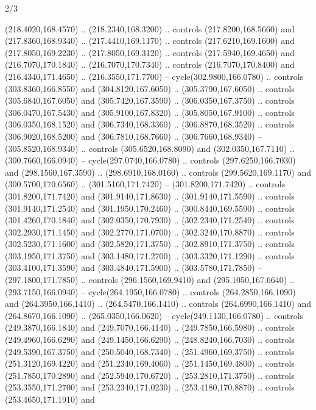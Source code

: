 \begin{flagdescription}{2/3}
\begin{scope}[xshift=0.5\flaglength,yshift=0.5\flagwidth,scale=\flagwidth/259.2]
\begin{scope}[y=0.8pt, x=0.8pt, yscale=-1,shift={(-243,-162)}]
      (218.4020,168.4570) .. (218.2340,168.3200) .. controls (217.8200,168.5660) and
      (217.8360,168.9340) .. (217.4410,169.1170) .. controls (217.6210,169.1600) and
      (217.8050,169.2230) .. (217.8050,169.3120) .. controls (217.5940,169.4650) and
      (216.7070,170.1840) .. (216.7070,170.7340) .. controls (216.7070,170.8400) and
      (216.4340,171.4650) .. (216.3550,171.7700) -- cycle(302.9800,166.0780) ..
      controls (303.8360,166.8550) and (304.8120,167.6050) .. (305.3790,167.6050) ..
      controls (305.6840,167.6050) and (305.7420,167.3590) .. (306.0350,167.3750) ..
      controls (306.0470,167.5430) and (305.9100,167.8320) .. (305.8050,167.9100) ..
      controls (306.0350,168.1520) and (306.7340,168.3360) .. (306.8870,168.3520) ..
      controls (306.9020,168.5200) and (306.7810,168.7660) .. (306.7660,168.9340) --
      (305.8520,168.9340) .. controls (305.6520,168.8090) and (302.0350,167.7110) ..
      (300.7660,166.0940) -- cycle(297.0740,166.0780) .. controls
      (297.6250,166.7030) and (298.1560,167.3590) .. (298.6910,168.0160) .. controls
      (299.5620,169.1170) and (300.5700,170.6560) .. (301.5160,171.7420) --
      (301.8200,171.7420) .. controls (301.8200,171.7420) and (301.9140,171.8630) ..
      (301.9140,171.5590) .. controls (301.9140,171.2540) and (301.1950,170.2460) ..
      (300.8440,169.5590) .. controls (301.4260,170.1840) and (302.0350,170.7930) ..
      (302.2340,171.2540) .. controls (302.2930,171.1450) and (302.2770,171.0700) ..
      (302.3240,170.8870) .. controls (302.5230,171.1600) and (302.5820,171.3750) ..
      (302.8910,171.3750) .. controls (303.1950,171.3750) and (303.1480,171.2700) ..
      (303.3320,171.1290) .. controls (303.4100,171.3590) and (303.4840,171.5900) ..
      (303.5780,171.7850) -- (297.1800,171.7850) .. controls (296.1560,169.9410) and
      (295.1050,167.6640) .. (293.7150,166.0940) -- cycle(264.1950,166.0780) ..
      controls (264.2850,166.1090) and (264.3950,166.1410) .. (264.5470,166.1410) ..
      controls (264.6990,166.1410) and (264.8670,166.1090) .. (265.0350,166.0620) --
      cycle(249.1130,166.0780) .. controls (249.3870,166.1840) and
      (249.7070,166.4140) .. (249.7850,166.5980) .. controls (249.4960,166.6290) and
      (249.1450,166.6290) .. (248.8240,166.7030) .. controls (249.5390,167.3750) and
      (250.5040,168.7340) .. (251.4960,169.3750) .. controls (251.3120,169.4220) and
      (251.2340,169.4060) .. (251.1450,169.4800) .. controls (251.7850,170.2890) and
      (252.5940,170.6720) .. (253.2810,171.3750) .. controls (253.3550,171.2700) and
      (253.2340,171.0230) .. (253.4180,170.8870) .. controls (253.4650,171.1910) and

\end{scope}
\end{scope}
\end{flagdescription}
